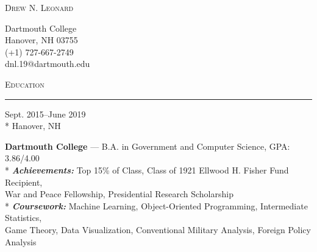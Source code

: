 \documentclass[a4paper,9pt]{article}
\begin{document}
\begin{minipage}[b]{0.70\linewidth}
	{\fontsize{32}{38}\selectfont \textsc{Drew N. Leonard}}
\end{minipage}
\begin{minipage}[b]{0.25\linewidth}
	\begin{flushright}
		\begin{small}
			Dartmouth College
			\\[0.25ex]
			Hanover, NH 03755
			\\[0.25ex]
			(+1) 727-667-2749
			\\[0.25ex]
			dnl.19@dartmouth.edu
			\\[0.25ex]
		\end{small}
	\end{flushright}
\end{minipage}

\vspace*{25pt}
\begin{Large}
	\textsc{Education}
\end{Large}
\vspace*{5pt}
\hrule

\vspace{2ex}	
\begin{minipage}[t]{0.20\linewidth}
	\begin{small}
		\begin{spacing}{1.00}
			\begin{flushright}
				Sept. 2015--June 2019
				\\*
				\vspace*{2.5pt}
				Hanover, NH
			\end{flushright}
		\end{spacing}
	\end{small}
\end{minipage}
\hspace{4mm}
\begin{minipage}[t]{0.75\linewidth}
	\begin{small}
		\begin{spacing}{1.00}
			\begin{flushleft}
				\textbf{Dartmouth College} --- B.A. in Government and Computer Science, GPA: 3.86/4.00
				\\*
				\vspace*{2.5pt} \textit{\textbf{Achievements:}} Top 15\% of Class, Class of 1921 Ellwood H. Fisher Fund Recipient, \\War and Peace Fellowship, Presidential Research Scholarship
				\\*
				\vspace*{2.5pt}
				\textit{\textbf{Coursework:}} Machine Learning, Object-Oriented Programming, Intermediate Statistics, \\Game Theory,
				Data Visualization, Conventional Military Analysis, Foreign Policy Analysis
			\end{flushleft}
		\end{spacing}
	\end{small}
\end{minipage}
\end{document}
